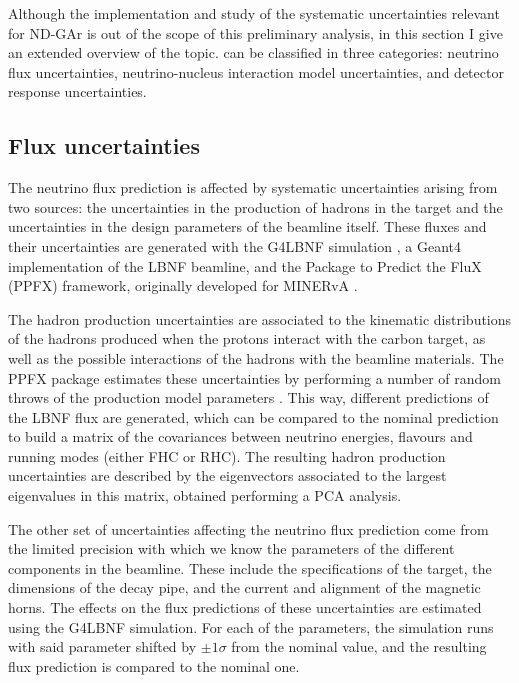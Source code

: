 Although the implementation and study of the systematic uncertainties relevant for ND-GAr is out of the scope of this preliminary analysis, in this section I give an extended overview of the topic. can be classified in three categories: neutrino flux uncertainties, neutrino-nucleus interaction model uncertainties, and detector response uncertainties.

\subsection{Flux uncertainties}

The neutrino flux prediction is affected by systematic uncertainties arising from two sources: the uncertainties in the production of hadrons in the target and the uncertainties in the design parameters of the beamline itself. These fluxes and their uncertainties are generated with the G4LBNF simulation \cite{DUNE2020TDR2}, a Geant4 implementation of the LBNF beamline, and the Package to Predict the FluX (PPFX) framework, originally developed for MINERvA \cite{Golan2016}.

The hadron production uncertainties are associated to the kinematic distributions of the hadrons produced when the protons interact with the carbon target, as well as the possible interactions of the hadrons with the beamline materials. The PPFX package estimates these uncertainties by performing a number of random throws of the production model parameters \cite{Bashyal2017}. This way, different predictions of the LBNF flux are generated, which can be compared to the nominal prediction to build a matrix of the covariances between neutrino energies, flavours and running modes (either FHC or RHC). The resulting hadron production uncertainties are described by the eigenvectors associated to the largest eigenvalues in this matrix, obtained performing a PCA analysis.

The other set of uncertainties affecting the neutrino flux prediction come from the limited precision with which we know the parameters of the different components in the beamline. These include the specifications of the target, the dimensions of the decay pipe, and the current and alignment of the magnetic horns. The effects on the flux predictions of these uncertainties are estimated using the G4LBNF simulation. For each of the parameters, the simulation runs with said parameter shifted by $\pm 1\sigma$ from the nominal value, and the resulting flux prediction is compared to the nominal one.

